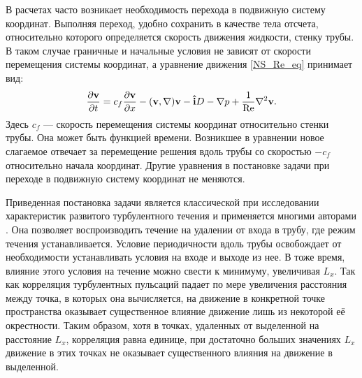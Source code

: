 В расчетах часто возникает необходимость перехода в подвижную систему координат. Выполняя переход, удобно сохранить в качестве тела отсчета, относительно которого определяется скорость движения жидкости, стенку трубы. В таком случае граничные и начальные условия не зависят от скорости перемещения системы координат, а уравнение движения \eqref{NS_Re_eq} принимает вид: 
\begin{equation}\label{NS_cf_eq}
\frac{\partial \mathbf{v}}{\partial t} = c_f \frac{\partial \mathbf{v}}{\partial x} - (\mathbf{v}, \nabla) \mathbf{v} - \mathbf{\hat{i}} D - \nabla p + \frac{1}{\operatorname{Re}} \nabla^2 \mathbf{v}. 
\end{equation}
Здесь $c_f$ --- скорость перемещения системы координат относительно стенки трубы. Она может быть функцией времени. Возникшее в уравнении новое слагаемое отвечает за перемещение решения вдоль трубы со скоростью $-c_f$ относительно начала координат. Другие уравнения в постановке задачи при переходе в подвижную систему координат не меняются. 


Приведенная постановка задачи является классической при исследовании характеристик развитого турбулентного течения и применяется многими авторами \cite{}. Она позволяет воспроизводить течение на удалении от входа в трубу, где режим течения устанавливается. Условие периодичности вдоль трубы освобождает от необходимости устанавливать условия на входе и выходе из нее. В тоже время, влияние этого условия на течение можно свести к минимуму, увеличивая $L_x$. Так как корреляция турбулентных пульсаций падает по мере увеличения расстояния между точка, в которых она вычисляется, на движение в конкретной точке пространства оказывает существенное влияние движение лишь из некоторой её окрестности. Таким образом, хотя в точках, удаленных от выделенной на расстояние $L_x$, корреляция равна единице, при достаточно больших значениях $L_x$ движение в этих точках не оказывает существенного влияния на движение в выделенной. 





